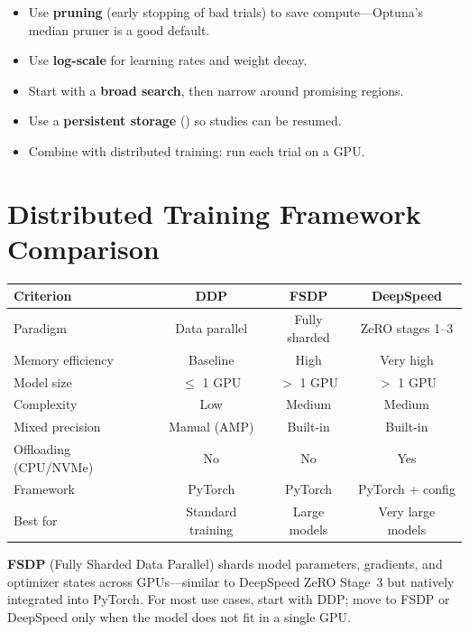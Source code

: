 \begin{bestpractice}[title=\textbf{HPO best practices}]
\begin{itemize}
  \item Use \textbf{pruning} (early stopping of bad trials) to save
    compute---Optuna's median pruner is a good default.
  \item Use \textbf{log-scale} for learning rates and weight decay.
  \item Start with a \textbf{broad search}, then narrow around promising
    regions.
  \item Use a \textbf{persistent storage} ()
    so studies can be resumed.
  \item Combine with distributed training: run each trial on a GPU.
\end{itemize}
\end{bestpractice}

\section{Distributed Training Framework Comparison}
\label{sec:distributed-comparison}

\begin{center}
\begin{tabular}{@{}lccc@{}}
\toprule
\textbf{Criterion} & \textbf{DDP} & \textbf{FSDP} & \textbf{DeepSpeed} \\
\midrule
Paradigm & Data parallel & Fully sharded & ZeRO stages 1--3 \\
Memory efficiency & Baseline & High & Very high \\
Model size & $\le$ 1 GPU & $>$ 1 GPU & $>$ 1 GPU \\
Complexity & Low & Medium & Medium \\
Mixed precision & Manual (AMP) & Built-in & Built-in \\
Offloading (CPU/NVMe) & No & No & Yes \\
Framework & PyTorch & PyTorch & PyTorch + config \\
Best for & Standard training & Large models & Very large models \\
\bottomrule
\end{tabular}
\end{center}

\begin{remark}
\textbf{FSDP} (Fully Sharded Data Parallel) shards model parameters,
gradients, and optimizer states across GPUs---similar to DeepSpeed ZeRO
Stage~3 but natively integrated into PyTorch. For most use cases, start
with DDP; move to FSDP or DeepSpeed only when the model does not fit in
a single GPU.
\end{remark}

